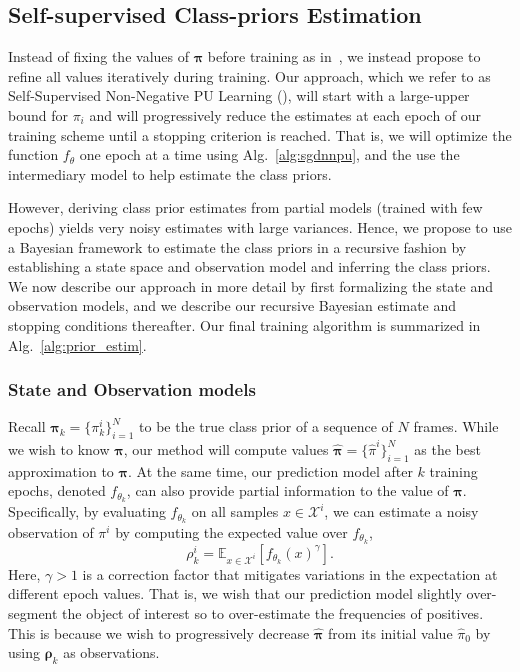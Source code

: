 \subsection{Self-supervised Class-priors Estimation}
\label{sec:pi_estim}
Instead of fixing the values of $\bm{\pi}$ before training as in~\cite{kiryo17}, we instead propose to refine all values iteratively during training. Our approach, which we refer to as Self-Supervised Non-Negative PU Learning (\SSnnPU), will start with a large-upper bound for $\pi_i$ and will progressively reduce the estimates at each epoch of our training scheme until a stopping criterion is reached. That is, we will optimize the function $f_\theta$ one epoch at a time using Alg.~\ref{alg:sgdnnpu}, and the use the intermediary model to help estimate the class priors.

However, deriving class prior estimates from partial models (\ie trained with few epochs) yields very noisy estimates with large variances. Hence, we propose to use a Bayesian framework to estimate the class priors in a recursive fashion by establishing a state space and observation model and inferring the class priors. We now describe our approach in more detail by first formalizing the state and observation models, and we describe our recursive Bayesian estimate and stopping conditions thereafter. Our final training algorithm is summarized in Alg.~\ref{alg:prior_estim}.

\subsubsection{State and Observation models}
Recall $\bm{\pi}_k=\{\pi_{k}^{i}\}_{i=1}^N$ to be the true class prior of a sequence of $N$ frames. While we wish to know $\bm{\pi}$, our method 
will compute values $\bm{\hat\pi}=\{\hat\pi^{i}\}_{i=1}^N$ as the best approximation to $\bm\pi$. At the same time, our prediction model after $k$ training epochs, denoted $f_{\theta_k}$, can also provide partial information to the value of $\bm\pi$. Specifically, by evaluating $f_{\theta_k}$ on all samples $x \in \mathcal{X}^i$, we can estimate a noisy observation of $\pi^i$ by computing the expected value over $f_{\theta_k}$,
\begin{equation}
  \label{eq:observ}
\rho_{k}^{i} = \mathbb{E}_{x \in \mathcal{X}^{i}}[f_{\theta_{k}}(x)^{\gamma}].
\end{equation}
\noindent 
Here, $\gamma > 1$ is a correction factor that mitigates variations in the expectation at different epoch values. That is, we wish that our prediction model slightly over-segment the object of interest so to over-estimate the frequencies of positives. This is because we wish to progressively decrease $\bm{\hat\pi}$ from its initial value $\hat \pi_{0}$ by using $\bm{\rho}_{k}$ as observations. 

